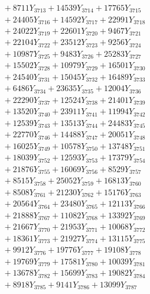 \documentclass[a4paper,10pt]{article}
\begin{document}
{\begin{align}
&\;  + 8711 Y_{3713} + 14539 Y_{3714} + 17765 Y_{3715} \\[0.3ex]
&\;  + 24405 Y_{3716} + 14592 Y_{3717} + 22991 Y_{3718} \\[0.5ex]\allowbreak
&\;  + 24022 Y_{3719} + 22601 Y_{3720} + 9467 Y_{3721} \\[0.3ex]
&\;  + 22104 Y_{3722} + 23512 Y_{3723} + 9256 Y_{3724} \\[0.3ex]
&\;  + 10987 Y_{3725} + 9483 Y_{3726} + 25283 Y_{3727} \\[0.3ex]
&\;  + 15502 Y_{3728} + 10979 Y_{3729} + 16501 Y_{3730} \\[0.3ex]
&\;  + 24540 Y_{3731} + 15045 Y_{3732} + 16489 Y_{3733} \\[0.3ex]
&\;  + 6486 Y_{3734} + 23635 Y_{3735} + 12004 Y_{3736} \\[0.3ex]
&\;  + 22290 Y_{3737} + 12524 Y_{3738} + 21401 Y_{3739} \\[0.3ex]
&\;  + 13520 Y_{3740} + 23911 Y_{3741} + 11994 Y_{3742} \\[0.3ex]
&\;  + 12539 Y_{3743} + 13513 Y_{3744} + 24483 Y_{3745} \\[0.3ex]
&\;  + 22770 Y_{3746} + 14488 Y_{3747} + 20051 Y_{3748} \\[0.5ex]\allowbreak
&\;  + 16025 Y_{3749} + 10578 Y_{3750} + 13748 Y_{3751} \\[0.3ex]
&\;  + 18039 Y_{3752} + 12593 Y_{3753} + 17379 Y_{3754} \\[0.3ex]
&\;  + 21876 Y_{3755} + 16069 Y_{3756} + 8529 Y_{3757} \\[0.3ex]
&\;  + 8515 Y_{3758} + 25052 Y_{3759} + 16813 Y_{3760} \\[0.3ex]
&\;  + 8508 Y_{3761} + 21230 Y_{3762} + 15176 Y_{3763} \\[0.3ex]
&\;  + 20564 Y_{3764} + 23480 Y_{3765} + 12113 Y_{3766} \\[0.3ex]
&\;  + 21888 Y_{3767} + 11082 Y_{3768} + 13392 Y_{3769} \\[0.3ex]
&\;  + 21667 Y_{3770} + 21953 Y_{3771} + 10068 Y_{3772} \\[0.3ex]
&\;  + 18361 Y_{3773} + 21927 Y_{3774} + 13115 Y_{3775} \\[0.3ex]
&\;  + 9912 Y_{3776} + 19776 Y_{3777} + 19108 Y_{3778} \\[0.5ex]\allowbreak
&\;  + 19769 Y_{3779} + 17581 Y_{3780} + 10039 Y_{3781} \\[0.3ex]
&\;  + 13678 Y_{3782} + 15699 Y_{3783} + 19082 Y_{3784} \\[0.3ex]
&\;  + 8918 Y_{3785} + 9141 Y_{3786} + 13099 Y_{3787} \\[0.3ex]

\end{align}}
\end{document}
